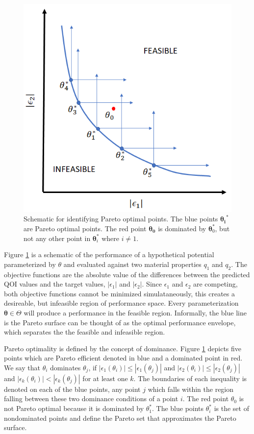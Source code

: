 \begin{figure}[ht]
	\centering
  \includegraphics[width=5in]{chapter3/img/fig_pareto_schematic}
  \caption{Schematic for identifying Pareto optimal points.  The blue points $\bm{\theta_i}^*$ are Pareto optimal points.  The red point $\bm{\theta_0}$ is dominated by $\bm{\theta}_0^*$, but not any other point in $\bm{\theta}_i^*$ where $i \neq 1$.}
  \label{fig:pareto_dominance}
\end{figure}

Figure \ref{fig:pareto_dominance} is a schematic of the performance of a hypothetical potential parameterized by $\theta$ and evaluated against two material properties $q_1$ and $q_2$.  The objective functions are the absolute value of the differences between the predicted QOI values and the target values, $|\epsilon_1|$ and $|\epsilon_2|$.  Since $\epsilon_1$ and $\epsilon_2$ are competing, both objective functions cannot be minimized simulataneously, this creates a desireable, but infeasible region of performance space. Every parameterization $\bm{\theta} \in \Theta$ will produce a performance in the feasible region.  Informally, the blue line is the Pareto surface can be thought of as the optimal performance envelope, which separates the the feasible and infeasible region.

Pareto optimality is defined by the concept of dominance.  Figure \ref{fig:pareto_dominance} depicts five points which are Pareto efficient denoted in blue and a dominated point in red.  We say that $\theta_i$ dominates $\theta_j$, if
 $|\epsilon_1(\theta_i)| \leq |\epsilon_1(\theta_j)|$ and
 $|\epsilon_2(\theta_i)| \leq |\epsilon_2(\theta_j)|$ and
 $|\epsilon_k(\theta_i)| < |\epsilon_k(\theta_j)|$ for at least one $k$.
 The boundaries of each inequality is denoted on each of the blue points, any point $j$ which falls within the region falling between these two dominance conditions of a point $i$.  The red point $\theta_0$ is not Pareto optimal because it is dominated by $\theta_1^*$.  The blue points $\theta_i^*$ is the set of nondominated points and define the Pareto set that approximates the Pareto surface.


